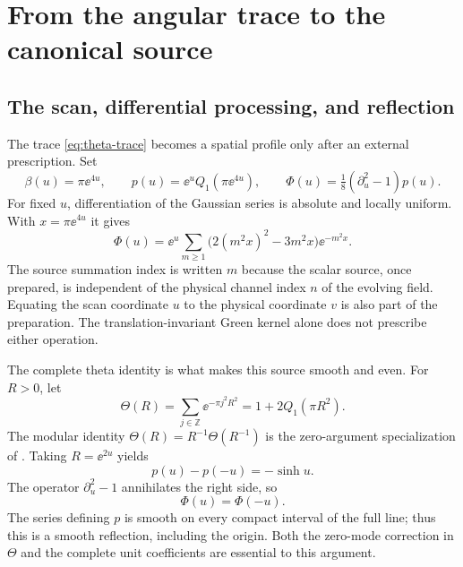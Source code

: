 \section{From the angular trace to the canonical source}
\label{sec:source}

\subsection{The scan, differential processing, and reflection}

The trace \eqref{eq:theta-trace} becomes a spatial profile only after an
external prescription. Set
\begin{equation}
 \beta(u)=\pi\ee^{4u},\qquad
 p(u)=\ee^uQ_1(\pi\ee^{4u}),\qquad
 \Phi(u)=\tfrac18(\partial_u^2-1)p(u).
 \label{eq:scan}
\end{equation}
For fixed $u$, differentiation of the Gaussian series is absolute and
locally uniform. With $x=\pi\ee^{4u}$ it gives
\begin{equation}
 \Phi(u)=\ee^u\sum_{m\ge1}
 \bigl(2(m^2x)^2-3m^2x\bigr)\ee^{-m^2x}.
 \label{eq:phi-series}
\end{equation}
The source summation index is written $m$ because the scalar source,
once prepared, is independent of the physical channel index $n$ of
the evolving field. Equating the scan coordinate $u$ to the physical
coordinate $v$ is also part of the preparation. The translation-invariant
Green kernel alone does not prescribe either operation.

The complete theta identity is what makes this source smooth and even.
For $R>0$, let
\begin{equation}
 \Theta(R)=\sum_{j\in\mathbb Z}\ee^{-\pi j^2R^2}
          =1+2Q_1(\pi R^2).
\end{equation}
The modular identity
$\Theta(R)=R^{-1}\Theta(R^{-1})$ is the zero-argument specialization
of \cite[20.7.32]{DLMFThetaModular}. Taking $R=\ee^{2u}$ yields
\begin{equation}
 p(u)-p(-u)=-\sinh u.
 \label{eq:reflection-p}
\end{equation}
The operator $\partial_u^2-1$ annihilates the right side, so
\begin{equation}
 \Phi(u)=\Phi(-u).
 \label{eq:phi-even}
\end{equation}
The series defining $p$ is smooth on every compact interval of the full
line; thus this is a smooth reflection, including the origin. Both the
zero-mode correction in $\Theta$ and the complete unit coefficients are
essential to this argument.

